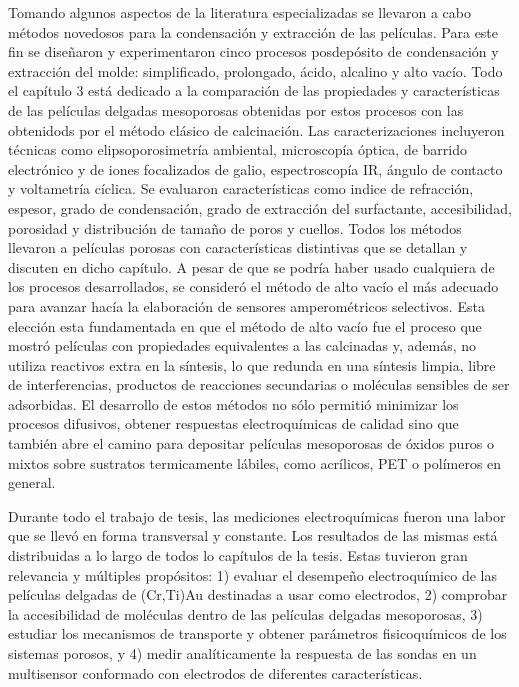  Tomando algunos aspectos de la literatura especializadas se llevaron a cabo métodos novedosos para la condensación y extracción de las películas. Para este fin se diseñaron y experimentaron cinco procesos posdepósito de condensación y extracción del molde: simplificado, prolongado, ácido, alcalino y alto vacío. Todo el capítulo 3 está dedicado a la comparación de las propiedades y características de las películas delgadas mesoporosas obtenidas por estos procesos con las obtenidods por el método clásico de calcinación. Las caracterizaciones incluyeron técnicas como elipsoporosimetría ambiental, microscopía óptica, de barrido electrónico y de iones focalizados de galio, espectroscopía IR, ángulo de contacto y voltametría cíclica. Se evaluaron características como indice de refracción, espesor, grado de condensación, grado de extracción del surfactante, accesibilidad, porosidad y distribución de tamaño de poros y cuellos. Todos los métodos llevaron a películas porosas con características distintivas que se detallan y discuten en dicho capítulo. A pesar de que se podría haber usado cualquiera de los procesos desarrollados, se consideró el método de alto vacío el más adecuado para avanzar hacía la elaboración de sensores amperométricos selectivos. Esta elección esta fundamentada en que el método de alto vacío fue el proceso que mostró películas con propiedades equivalentes a las calcinadas y, además, no utiliza reactivos extra en la síntesis, lo que redunda en una síntesis limpia, libre de interferencias, productos de reacciones secundarias o moléculas sensibles de ser adsorbidas. El desarrollo de estos métodos no sólo permitió minimizar los procesos difusivos, obtener respuestas electroquímicas de calidad sino que también abre el camino para depositar películas mesoporosas de óxidos puros o mixtos sobre sustratos termicamente lábiles, como acrílicos, PET o polímeros en general.

 Durante todo el trabajo de tesis, las mediciones electroquímicas fueron una labor que se llevó en forma transversal y constante. Los resultados de las mismas está distribuidas a lo largo de todos lo capítulos de la tesis. Estas tuvieron gran relevancia y múltiples propósitos: 1) evaluar el desempeño electroquímico de las películas delgadas de (Cr,Ti)\textbar Au destinadas a usar como electrodos, 2) comprobar la accesibilidad de moléculas dentro de las películas delgadas mesoporosas, 3) estudiar los mecanismos de transporte y obtener parámetros fisicoquímicos de los sistemas porosos, y 4) medir analíticamente la respuesta de las sondas en un multisensor conformado con electrodos de diferentes características.

